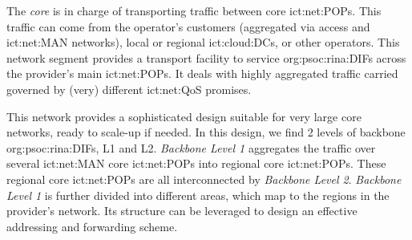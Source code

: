 The \textit{core} is in charge of transporting traffic between core \acp{ict:net:POP}.
This traffic can come from
    the operator's customers (aggregated via access and \ac{ict:net:MAN} networks),
    local or regional \acp{ict:cloud:DC}, or
    other operators.
This network segment provides a transport facility to service \acp{org:psoc:rina:DIF} across the provider's main \acp{ict:net:POP}.
It deals with highly aggregated traffic carried governed by (very) different \ac{ict:net:QoS} promises.

This network provides a sophisticated design suitable for very large core networks, ready to scale-up if needed.
In this design, we find 2 levels of backbone \acp{org:psoc:rina:DIF}, L1 and L2.
\textit{Backbone Level 1} aggregates the traffic over several \ac{ict:net:MAN} core \acp{ict:net:POP} into regional core \acp{ict:net:POP}.
These regional core \acp{ict:net:POP} are all interconnected by \textit{Backbone Level 2}.
\textit{Backbone Level 1} is further divided into different areas, which map to the regions in the provider's network.
Its structure can be leveraged to design an effective addressing and forwarding scheme.
